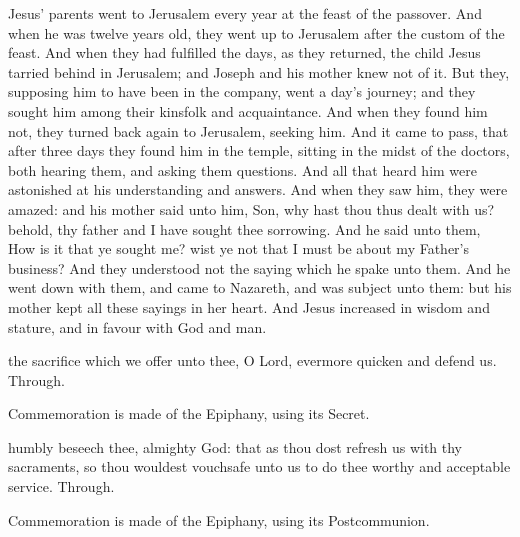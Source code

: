 \vspace{-1ex}
 Jesus' parents went to Jerusalem every year at the feast of the passover. And when he was twelve years old, they went up to Jerusalem after the custom of the feast. And when they had fulfilled the days, as they returned, the child Jesus tarried behind in Jerusalem; and Joseph and his mother knew not of it. But they, supposing him to have been in the company, went a day's journey; and they sought him among their kinsfolk and acquaintance. And when they found him not, they turned back again to Jerusalem, seeking him. And it came to pass, that after three days they found him in the temple, sitting in the midst of the doctors, both hearing them, and asking them questions. And all that heard him were astonished at his understanding and answers. And when they saw him, they were amazed: and his mother said unto him, Son, why hast thou thus dealt with us? behold, thy father and I have sought thee sorrowing. And he said unto them, How is it that ye sought me? wist ye not that I must be about my Father's business? And they understood not the saying which he spake unto them. And he went down with them, and came to Nazareth, and was subject unto them: but his mother kept all these sayings in her heart. And Jesus increased in wisdom and stature, and in favour with God and man.

\secret
{} the sacrifice which we offer unto thee, O Lord, evermore quicken and defend us. Through.
\begin{rubric}
    Commemoration is made of the Epiphany, using its Secret.
\end{rubric}
\postcommunion
{} humbly beseech thee, almighty God: that as thou dost refresh us with thy sacraments, so thou wouldest vouchsafe unto us to do thee worthy and acceptable service. Through.
\begin{rubric}
    Commemoration is made of the Epiphany, using its Postcommunion.
\end{rubric}

